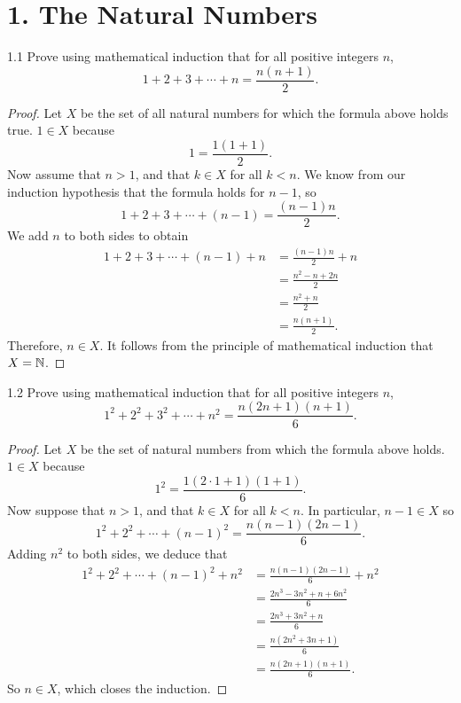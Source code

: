 \section*{1. The Natural Numbers}

\begin{exercise}{1.1}
Prove using mathematical induction that for all positive integers \(n\),
\[1+2+3+\cdots+n = \frac{n(n+1)}{2}.\]
\end{exercise}
\begin{proof}
    Let \(X\) be the set of all natural numbers for which the formula above holds true.
    \(1 \in X\) because \[1 = \frac{1(1+1)}{2}.\]
    Now assume that \(n > 1\), and that \(k \in X\) for all \(k < n\). We know from our induction hypothesis
    that the formula holds for \(n-1\), so
    \[1 + 2 + 3 +\cdots + (n-1) = \frac{(n-1)n}{2}.\]
    We add \(n\) to both sides to obtain
    \begin{align*}
        1 + 2 + 3 + \cdots + (n-1) + n &= \frac{(n-1)n}{2} + n \\
        &= \frac{n^2 - n + 2n}{2} \\
        &= \frac{n^2 + n}{2} \\
        &= \frac{n(n+1)}{2}.
    \end{align*}
    Therefore, \(n \in X\). It follows from the principle of mathematical induction that \(X = \mathbb{N}\).
\end{proof}

\begin{exercise}{1.2}
    Prove using mathematical induction that for all positive integers \(n\),
    \[1^2 + 2^2 + 3^2 + \cdots + n^2 = \frac{n(2n+1)(n+1)}{6}.\]
\end{exercise}
\begin{proof}
    Let \(X\) be the set of natural numbers from which the formula above holds.
    \(1 \in X\) because \[1^2 = \frac{1(2\cdot 1 + 1)(1 + 1)}{6}.\]
    Now suppose that \(n > 1\), and that \(k \in X\) for all \(k < n\). In particular,
    \(n-1 \in X\) so \[1^2 + 2^2 + \cdots + (n-1)^2 = \frac{n(n-1)(2n-1)}{6}.\]
    Adding \(n^2\) to both sides, we deduce that
    \begin{align*}
        1^2 + 2^2 + \cdots + (n-1)^2 + n^2 &= \frac{n(n-1)(2n-1)}{6} + n^2\\
        &= \frac{2n^3-3n^2+n+6n^2}{6} \\
        &= \frac{2n^3+3n^2+n}{6}\\
        &= \frac{n(2n^2 + 3n + 1)}{6}\\
        &= \frac{n(2n+1)(n+1)}{6}.
    \end{align*}
    So \(n \in X\), which closes the induction.
\end{proof}

